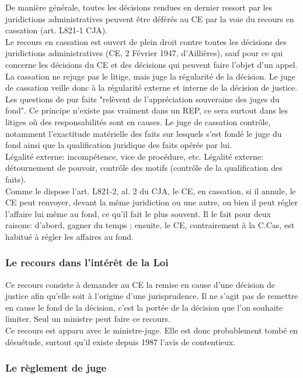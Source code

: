 \documentclass[10pt, a4paper, openany]{book}
\begin{document}
De manière générale, toutes les décisions rendues en dernier ressort par les juridictions administratives peuvent être déférés au CE par la voie du recours en cassation (art. L821-1 CJA). \\
Le recours en cassation est ouvert de plein droit contre toutes les décisions des juridictions administratives (CE, 2 Février 1947, d'Aillières), sauf pour ce qui concerne les décisions du CE et des décisions qui peuvent faire l'objet d'un appel. \\
La cassation ne rejuge pas le litige, mais juge la régularité de la décision. Le juge de cassation veille donc à la régularité externe et interne de la décision de justice. \\
Les questions de pur faits "relèvent de l'appréciation souveraine des juges du fond". Ce principe n'existe pas vraiment dans un REP, ce sera surtout dans les litiges où des responsabilités sont en causes. Le juge de cassation contrôle, notamment l'exactitude matérielle des faits sur lesquels s'est fondé le juge du fond ainsi que la qualification juridique des faits opérée par lui. \\
Légalité externe: incompétence, vice de procédure, etc. Légalité externe: détournement de pouvoir, contrôle des motifs (contrôle de la qualification des faits). \\
Comme le dispose l'art. L821-2, al. 2 du CJA, le CE, en cassation, si il annule, le CE peut renvoyer, devant la même juridiction ou une autre, ou bien il peut régler l'affaire lui même au fond, ce qu'il fait le plus souvent. Il le fait pour deux raisons: d'abord, gagner du temps ; ensuite, le CE, contrairement à la C.Cas, est habitué à régler les affaires au fond. 

\subsubsection{Le recours dans l'intérêt de la Loi}

Ce recours consiste à demander au CE la remise en cause d'une décision de justice afin qu'elle soit à l'origine d'une jurisprudence. Il ne s'agit pas de remettre en cause le fond de la décision, c'est la portée de la décision que l'on souhaite limiter. Seul un ministre peut faire ce recours. \\
Ce recours est apparu avec le ministre-juge. Elle est donc probablement tombé en désuétude, surtout qu'il existe depuis 1987 l'avis de contentieux. 

\subsubsection{Le règlement de juge}
\end{document}
